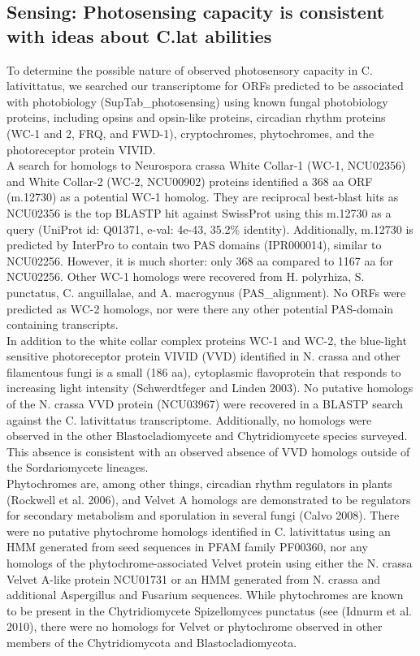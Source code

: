 \subsection*{Sensing: Photosensing capacity is consistent with ideas about C.lat abilities}
To determine the possible nature of observed photosensory capacity in C. lativittatus, we searched our transcriptome for ORFs predicted to be associated with photobiology (SupTab\_photosensing) using known fungal photobiology proteins, including opsins and opsin-like proteins, circadian rhythm proteins (WC-1 and 2, FRQ, and FWD-1), cryptochromes, phytochromes, and the photoreceptor protein VIVID. \\
\indent A search for homologs to Neurospora crassa White Collar-1 (WC-1, NCU02356) and White Collar-2 (WC-2, NCU00902) proteins identified a 368 aa ORF (m.12730) as a potential WC-1 homolog. They are reciprocal best-blast hits as NCU02356 is the top BLASTP hit against SwissProt using this m.12730 as a query (UniProt id: Q01371, e-val: 4e-43, 35.2\% identity). Additionally, m.12730 is predicted by InterPro to contain two PAS domains (IPR000014), similar to NCU02256. However, it is much shorter: only 368 aa compared to 1167 aa for NCU02256. Other WC-1 homologs were recovered from H. polyrhiza, S. punctatus, C. anguillalae, and A. macrogynus (PAS\_alignment). No ORFs were predicted as WC-2 homologs, nor were there any other potential PAS-domain containing transcripts. \\
\indent In addition to the white collar complex proteins WC-1 and WC-2, the blue-light sensitive photoreceptor protein VIVID (VVD) identified in N. crassa and other filamentous fungi is a small (186 aa), cytoplasmic flavoprotein that responds to increasing light intensity (Schwerdtfeger and Linden 2003). No putative homologs of the N. crassa VVD protein (NCU03967) were recovered in a BLASTP search against the C. lativittatus transcriptome. Additionally, no homologs were observed in the other Blastocladiomycete and Chytridiomycete species surveyed. This absence is consistent with an observed absence of VVD homologs outside of the Sordariomycete lineages. \\
\indent Phytochromes are, among other things, circadian rhythm regulators in plants (Rockwell et al. 2006), and Velvet A homologs are demonstrated to be regulators for secondary metabolism and sporulation in several fungi (Calvo 2008). There were no putative phytochrome homologs identified in C. lativittatus using an HMM generated from seed sequences in PFAM family PF00360, nor any homologs of the phytochrome-associated Velvet protein using either the N. crassa Velvet A-like protein NCU01731 or an HMM generated from N. crassa and additional Aspergillus and Fusarium sequences. While phytochromes are known to be present in the Chytridiomycete Spizellomyces punctatus (see (Idnurm et al. 2010), there were no homologs for Velvet or phytochrome observed in other members of the Chytridiomycota and Blastocladiomycota. \\
